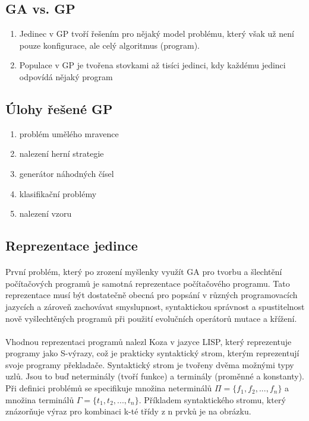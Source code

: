 \documentclass[bc,male,java,dept460]{diploma}		%
\begin{document}
\subsection{GA vs. GP}
\begin{enumerate}
\item Jedinec v GP tvoří řešením pro nějaký model problému, který však už není pouze konfigurace, ale celý algoritmus (program).
\item Populace v GP je tvořena stovkami až tisíci jedinci, kdy každému jedinci odpovídá nějaký program
\end{enumerate}

\subsection{Úlohy řešené GP}
\begin{enumerate}
\item problém umělého mravence
\item nalezení herní strategie
\item generátor náhodných čísel
\item klasifikační problémy
\item nalezení vzoru
\end{enumerate}

\subsection{Reprezentace jedince}
\paragraph*{}
První problém, který po zrození myšlenky využít GA pro tvorbu a šlechtění počítačových programů je samotná reprezentace počítačového programu. Tato reprezentace musí být dostatečně obecná pro popsání v různých programovacích jazycích a zároveň zachovávat smyslupnost, syntaktickou správnost a spustitelnost nově vyšlechtěných programů při použití evolučních operátorů mutace a křížení.
\paragraph*{}
Vhodnou reprezentaci programů nalezl Koza v jazyce LISP, který reprezentuje programy jako S-výrazy, což je prakticky syntaktický strom, kterým reprezentují svoje programy překladače. Syntaktický strom je tvořeny dvěma možnými typy uzlů. Jsou to buď neterminály (tvoří funkce) a terminály (proměnné a konstanty). Při definici problémů se specifikuje množina neterminálů $\Pi=\{f_1,f_2,...,f_n\}$ a množina terminálů $\Gamma=\{t_1,t_2,...,t_n\}$. Příkladem syntaktického stromu, který znázorňuje výraz pro kombinaci k-té třídy z n prvků je na obrázku.
\end{document}
